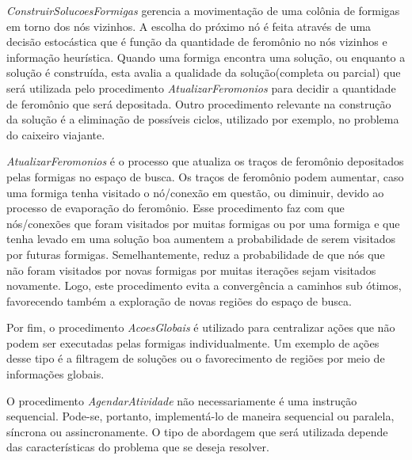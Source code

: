 \textit{ConstruirSolucoesFormigas} gerencia a movimentação de uma colônia de formigas
em torno dos nós vizinhos. A escolha do próximo nó é feita através de uma decisão 
estocástica que é função da quantidade de feromônio no nós vizinhos e informação heurística.
Quando uma formiga encontra uma solução, ou enquanto a solução é construída, esta avalia a
qualidade da solução(completa ou parcial) que será utilizada pelo procedimento
\textit{AtualizarFeromonios} para decidir a quantidade de feromônio que será depositada.
Outro procedimento relevante na construção da solução é a eliminação de possíveis ciclos, utilizado
por exemplo, no problema do caixeiro viajante.

\textit{AtualizarFeromonios} é o processo que atualiza os traços de feromônio depositados pelas
formigas no espaço de busca. Os traços de feromônio podem aumentar, caso uma formiga tenha visitado
o nó/conexão em questão, ou diminuir, devido ao processo de evaporação do feromônio. Esse procedimento faz com 
que nós/conexões que foram visitados por muitas formigas ou por uma formiga e que tenha levado em
uma solução boa aumentem a probabilidade de serem visitados por futuras formigas. Semelhantemente, reduz 
a probabilidade de que nós que não foram visitados por novas formigas por muitas iterações sejam visitados
novamente. Logo, este procedimento evita a convergência a caminhos sub ótimos, favorecendo também a exploração
de novas regiões do espaço de busca.

Por fim, o procedimento \textit{AcoesGlobais} é utilizado para centralizar ações que não podem ser executadas
pelas formigas individualmente. Um exemplo de ações desse tipo é a filtragem de soluções ou o favorecimento de
regiões por meio de informações globais.

O procedimento \textit{AgendarAtividade} não necessariamente é uma instrução sequencial. Pode-se, portanto,
implementá-lo de maneira sequencial ou paralela, síncrona ou assincronamente. O tipo de abordagem que será
utilizada depende das características do problema que se deseja resolver.
